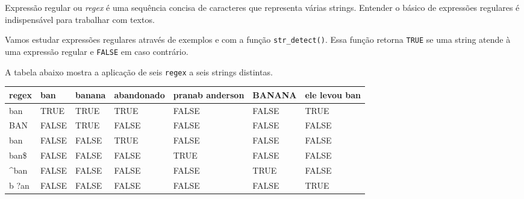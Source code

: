 \documentclass[]{book}
\newenvironment{Shaded}{\begin{snugshade}}{\end{snugshade}}
\newcommand{\KeywordTok}[1]{\textcolor[rgb]{0.13,0.29,0.53}{\textbf{{#1}}}}
\newcommand{\DataTypeTok}[1]{\textcolor[rgb]{0.13,0.29,0.53}{{#1}}}
\newcommand{\StringTok}[1]{\textcolor[rgb]{0.31,0.60,0.02}{{#1}}}
\newcommand{\CommentTok}[1]{\textcolor[rgb]{0.56,0.35,0.01}{\textit{{#1}}}}
\newcommand{\OtherTok}[1]{\textcolor[rgb]{0.56,0.35,0.01}{{#1}}}
\newcommand{\NormalTok}[1]{{#1}}
\begin{document}
Expressão regular ou \emph{regex} é uma sequência concisa de caracteres
que representa várias strings. Entender o básico de expressões regulares
é indispensável para trabalhar com textos.

Vamos estudar expressões regulares através de exemplos e com a função
\texttt{str\_detect()}. Essa função retorna \texttt{TRUE} se uma string
atende à uma expressão regular e \texttt{FALSE} em caso contrário.

A tabela abaixo mostra a aplicação de seis \texttt{regex} a seis strings
distintas.

\begin{Shaded}
\end{Shaded}

\begin{tabular}{l|l|l|l|l|l|l}
\hline
regex & ban & banana & abandonado & pranab anderson & BANANA & ele levou ban\\
\hline
ban & TRUE & TRUE & TRUE & FALSE & FALSE & TRUE\\
\hline
BAN & FALSE & TRUE & FALSE & FALSE & FALSE & FALSE\\
\hline
ban & FALSE & FALSE & TRUE & FALSE & FALSE & FALSE\\
\hline
ban\$ & FALSE & FALSE & FALSE & TRUE & FALSE & FALSE\\
\hline
\textasciicircum{}ban & FALSE & FALSE & FALSE & FALSE & TRUE & FALSE\\
\hline
b ?an & FALSE & FALSE & FALSE & FALSE & FALSE & TRUE\\
\hline
\end{tabular}
\end{document}

